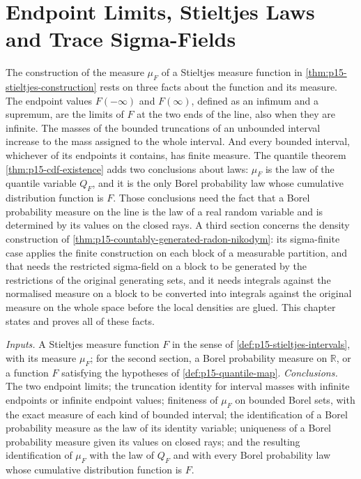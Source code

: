 \chapter{Endpoint Limits, Stieltjes Laws and Trace Sigma-Fields}
\label{sec:p15-w02c-p15-003-stieltjes-endpoints}

The construction of the measure \(\mu_F\) of a Stieltjes measure function
in \cref{thm:p15-stieltjes-construction} rests on three facts about the
function and its measure. The endpoint values \(F(-\infty)\) and
\(F(\infty)\), defined as an infimum and a supremum, are the limits of
\(F\) at the two ends of the line, also when they are infinite. The masses
of the bounded truncations of an unbounded interval increase to the mass
assigned to the whole interval. And every bounded interval, whichever of
its endpoints it contains, has finite measure. The quantile theorem
\cref{thm:p15-cdf-existence} adds two conclusions about laws: \(\mu_F\)
is the law of the quantile variable \(Q_F\), and it is the only Borel
probability law whose cumulative distribution function is \(F\). Those
conclusions need the fact that a Borel probability measure on the line is
the law of a real random variable and is determined by its values on the
closed rays. A third section concerns the density construction of
\cref{thm:p15-countably-generated-radon-nikodym}: its sigma-finite case
applies the finite construction on each block of a measurable partition, and
that needs the restricted sigma-field on a block to be generated by the
restrictions of the original generating sets, and it needs integrals
against the normalised measure on a block to be converted into integrals
against the original measure on the whole space before the local densities
are glued. This chapter states and
proves all of these facts.

\emph{Inputs.} A Stieltjes measure function \(F\) in the sense of
\cref{def:p15-stieltjes-intervals}, with its measure \(\mu_F\); for the
second section, a Borel probability measure on \(\mathbb R\), or a
function \(F\) satisfying the hypotheses of \cref{def:p15-quantile-map}.
\emph{Conclusions.} The two endpoint limits; the truncation identity for
interval masses with infinite endpoints or infinite endpoint values;
finiteness of \(\mu_F\) on bounded Borel sets, with the exact measure of
each kind of bounded interval; the identification of a Borel probability
measure as the law of its identity variable; uniqueness of a Borel
probability measure given its values on closed rays; and the resulting
identification of \(\mu_F\) with the law of \(Q_F\) and with every Borel
probability law whose cumulative distribution function is \(F\).

